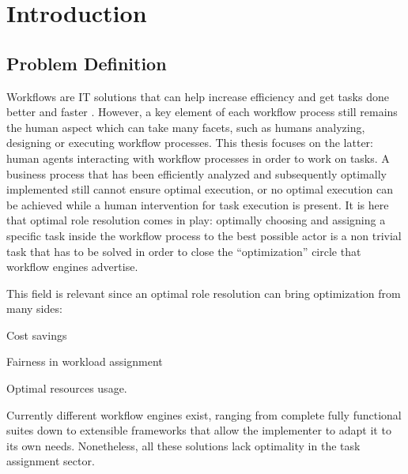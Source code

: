 \documentclass[draft=false]{seal_thesis}
\begin{document}
\begin{zusammenfassung}
\end{zusammenfassung}

\tableofcontents

\clearpage

\listoffigures

\clearpage

\listoftables

\mainmatter

\glsresetall

\chapter{Introduction}
\label{ch:intro}

\section{Problem Definition}

Workflows are IT solutions that can help increase efficiency and get tasks done better and faster \citep{Mentzas2001}. However, a key element of each workflow process still remains the human aspect which can take many facets, such as humans analyzing, designing or executing workflow processes. This thesis focuses on the latter: human agents interacting with workflow processes in order to work on tasks. A business process that has been efficiently analyzed and subsequently optimally implemented still cannot ensure optimal execution, or no optimal execution can be achieved while a human intervention for task execution is present. It is here that optimal role resolution comes in play: optimally choosing and assigning a specific task inside the workflow process to the best possible actor is a non trivial task that has to be solved in order to close the ``optimization'' circle that workflow engines advertise.

This field is relevant since an optimal role resolution can bring optimization from many sides:
\begin{enumerate*}
	\item Cost savings
	\item Fairness in workload assignment
	\item Optimal resources usage.
\end{enumerate*}

Currently different workflow engines exist, ranging from complete fully functional suites down to extensible frameworks that allow the implementer to adapt it to its own needs. Nonetheless, all these solutions lack optimality in the task assignment sector.
\end{document}
